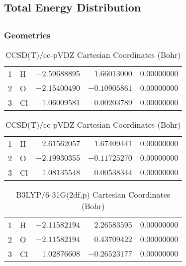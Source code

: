 \documentclass[10pt,oneside]{article}
\begin{document}
\begin{table}
\subsection*{Total Energy Distribution}
\centering\end{table}

\clearpage

\subsection{}

\begin{table}[h!]
\subsubsection*{Geometries}
\begin{multicols}{2}
\centering
\caption{CCSD(T)/cc-pVTZ Cartesian Coordinates (Bohr)}
\begin{tabular}{llrrr}
\toprule
1  & H  & $-2.59688895$ & $ 1.66013000$ & $ 0.00000000$ \\
2  & O  & $-2.15400490$ & $-0.10905861$ & $ 0.00000000$ \\
3  & Cl & $ 1.06009581$ & $ 0.00203789$ & $ 0.00000000$ \\
\bottomrule
\end{tabular}
\caption{CCSD(T)/cc-pVDZ Cartesian Coordinates (Bohr)}
\begin{tabular}{llrrr}
\toprule
1  & H  & $-2.61562057$ & $ 1.67409441$ & $ 0.00000000$ \\
2  & O  & $-2.19930355$ & $-0.11725270$ & $ 0.00000000$ \\
3  & Cl & $ 1.08135548$ & $ 0.00538344$ & $ 0.00000000$ \\
\bottomrule
\end{tabular}
\end{multicols}
\end{table}

\begin{table}[h]
\centering
\caption{B3LYP/6-31G(2df,p) Cartesian Coordinates (Bohr)}
\begin{tabular}{llrrr}
\toprule
1  & H  & $-2.11582194$ & $ 2.26583595$ & $ 0.00000000$ \\
2  & O  & $-2.11582194$ & $ 0.43709422$ & $ 0.00000000$ \\
3  & Cl & $ 1.02876608$ & $-0.26523177$ & $ 0.00000000$ \\
\bottomrule
\end{tabular}
\end{table}
\end{document}
